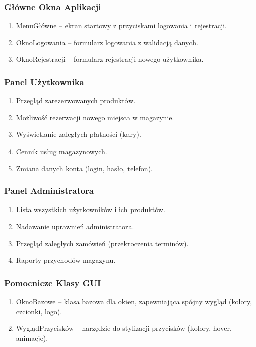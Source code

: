 \subsubsection{Główne Okna Aplikacji}
\begin{enumerate}
    \item MenuGłówne – ekran startowy z przyciskami logowania i rejestracji.
    \item OknoLogowania – formularz logowania z walidacją danych.
    \item OknoRejestracji – formularz rejestracji nowego użytkownika.
\end{enumerate}

\subsubsection{Panel Użytkownika}
\begin{enumerate}
    \item Przegląd zarezerwowanych produktów.
    \item Możliwość rezerwacji nowego miejsca w magazynie.
    \item Wyświetlanie zaległych płatności (kary).
    \item Cennik usług magazynowych.
    \item Zmiana danych konta (login, hasło, telefon).
\end{enumerate}

\subsubsection{Panel Administratora}
\begin{enumerate}
    \item Lista wszystkich użytkowników i ich produktów.
    \item Nadawanie uprawnień administratora.
    \item Przegląd zaległych zamówień (przekroczenia terminów).
    \item Raporty przychodów magazynu.
\end{enumerate}

\subsubsection{Pomocnicze Klasy GUI}
\begin{enumerate}
    \item OknoBazowe – klasa bazowa dla okien, zapewniająca spójny wygląd (kolory, czcionki, logo).
    \item WyglądPrzycisków – narzędzie do stylizacji przycisków (kolory, hover, animacje).
\end{enumerate}

